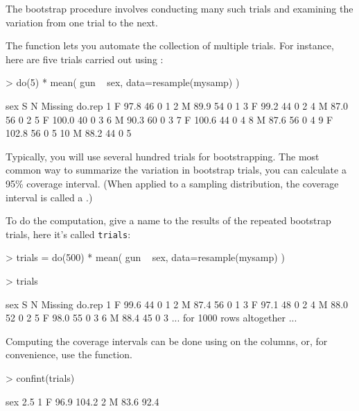 
The bootstrap procedure involves conducting many such trials and examining the
variation from one trial to the next.  

The  function lets
you automate the collection of multiple trials.  For instance, here
are five trials carried out using :
\begin{Schunk}
\begin{Sinput}
> do(5) * mean( gun ~ sex, data=resample(mysamp) )
\end{Sinput}
\begin{Soutput}
   sex     S  N Missing do.rep
1    F  97.8 46       0      1
2    M  89.9 54       0      1
3    F  99.2 44       0      2
4    M  87.0 56       0      2
5    F 100.0 40       0      3
6    M  90.3 60       0      3
7    F 100.6 44       0      4
8    M  87.6 56       0      4
9    F 102.8 56       0      5
10   M  88.2 44       0      5
\end{Soutput}
\end{Schunk}

Typically, you will use several hundred trials for bootstrapping.  The
most common way to summarize the variation in bootstrap trials, you
can calculate a 95\% coverage interval.  (When applied to a sampling
distribution, the coverage interval is called a .)

To do the computation, give a name to  the results of the repeated
bootstrap trials, here it's called \texttt{trials}:
\begin{Schunk}
\begin{Sinput}
> trials = do(500) * mean( gun ~ sex, data=resample(mysamp) )
\end{Sinput}
\end{Schunk}
\begin{Schunk}
\begin{Sinput}
> trials
\end{Sinput}
\end{Schunk}
\begin{Schunk}
\begin{Soutput}
  sex    S  N Missing do.rep
1   F 99.6 44       0      1
2   M 87.4 56       0      1
3   F 97.1 48       0      2
4   M 88.0 52       0      2
5   F 98.0 55       0      3
6   M 88.4 45       0      3
... for 1000 rows altogether ...
\end{Soutput}
\end{Schunk}

Computing the coverage intervals can be done using  on
the columns, or, for convenience, use the  function.
\begin{Schunk}
\begin{Sinput}
> confint(trials)
\end{Sinput}
\begin{Soutput}
  sex 2.5% 97.5%
1   F 96.9 104.2
2   M 83.6  92.4
\end{Soutput}
\end{Schunk}


